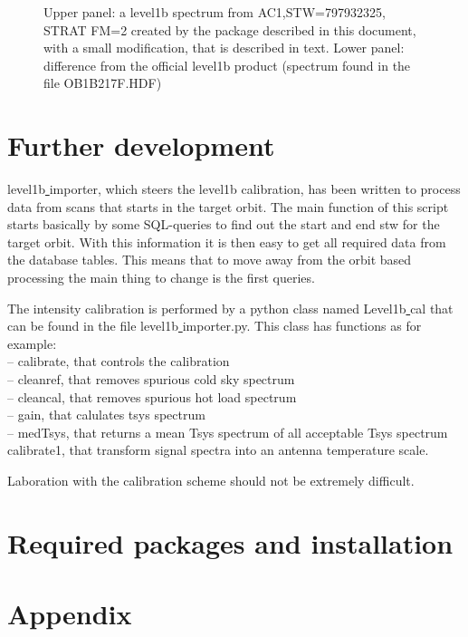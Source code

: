 \documentclass[12pt]{article}
\begin{document}
\begin{figure}[!t]
\centering
\caption{Upper panel: a level1b spectrum from AC1,STW=797932325,
STRAT FM=2 created by the package described in this document,
with a small modification, that is described in text.
Lower panel: difference from the official level1b product
(spectrum found in the file OB1B217F.HDF) }
\label{fig:odin1}
\end{figure}



\section{Further development}
level1b\underline{ }importer, which steers the level1b
calibration, has been written to process data from scans
that starts in the target orbit.
The main function of this script starts basically by some
SQL-queries to find out the start and end stw for the target orbit.
With this information it is then easy to get all required
data from the database tables.
This means that to move away from the orbit based processing
the main thing to change is the first queries.

The intensity calibration is performed by a python class
named Level1b\underline{ }cal that can
be found in the file level1b\underline{ }importer.py.
This class has functions as for example:\\
-- calibrate, that controls the calibration\\
-- cleanref, that removes spurious cold sky spectrum\\
-- cleancal, that removes spurious hot load spectrum\\
-- gain, that calulates tsys spectrum\\
-- medTsys, that returns a mean Tsys spectrum of all acceptable
Tsys spectrum\\ 
calibrate1, that transform signal spectra into an antenna temperature
scale.
 
Laboration with the calibration scheme should not be extremely
difficult.
  
\section{Required packages and installation}


\section{Appendix}
\end{document}
